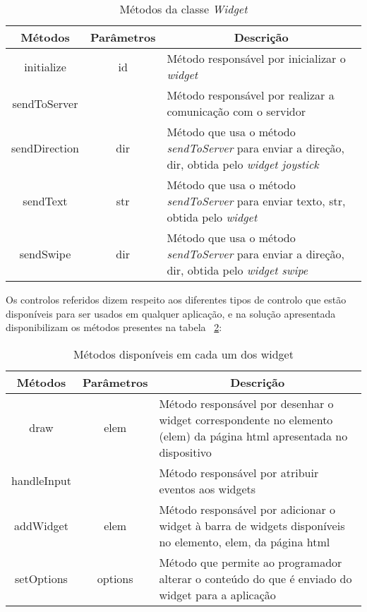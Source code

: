 	\begin{table}[ht]
 	\renewcommand{\arraystretch}{1.5}
	\centering

	\begin{tabular}{ p{2cm}|p{2cm}|p{10cm}  }
	\multicolumn{1}{c}{\textbf{Métodos}} & \multicolumn{1}{c}{\textbf{Parâmetros}} & \multicolumn{1}{c}{\textbf{Descrição}} \\
	\hline
	\multicolumn{1}{c}{initialize} & \multicolumn{1}{c}{id} &Método responsável por inicializar o \textit{widget} \\
	\hline
	\multicolumn{1}{c}{sendToServer} & \multicolumn{1}{c}{} &Método responsável por realizar a comunicação com o servidor \\
	\hline
	\multicolumn{1}{c}{sendDirection} & \multicolumn{1}{c}{dir} &Método que usa o método \textit{sendToServer} para enviar a direção, dir, obtida pelo \textit{widget joystick} \\
	\hline
	\multicolumn{1}{c}{sendText} & \multicolumn{1}{c}{str} &Método que usa o método \textit{sendToServer} para enviar texto, str, obtida pelo \textit{widget}  \\
	\hline
	\multicolumn{1}{c}{sendSwipe} & \multicolumn{1}{c}{dir} &Método que usa o método \textit{sendToServer} para enviar a direção, dir, obtida pelo \textit{widget swipe}  \\
	\hline
	\end{tabular}
	\caption{Métodos da classe \textit{Widget}}
	\label{table:widget_met}
	\end{table}
	
	Os controlos referidos dizem respeito aos diferentes tipos de controlo que estão disponíveis para ser usados em qualquer aplicação, e na solução apresentada disponibilizam os métodos presentes na tabela ~\ref{table:metodos}:
	
 	\begin{table}[ht]
 	\renewcommand{\arraystretch}{1.5}
	\centering

	\begin{tabular}{ p{2cm}|p{2cm}|p{10cm}  }
	\multicolumn{1}{c}{\textbf{Métodos}} & \multicolumn{1}{c}{\textbf{Parâmetros}} & \multicolumn{1}{c}{\textbf{Descrição}} \\
	\hline
	\multicolumn{1}{c}{draw} & \multicolumn{1}{c}{elem} &Método responsável por desenhar o widget correspondente no elemento (elem) da página html apresentada no dispositivo \\
	\hline
	\multicolumn{1}{c}{handleInput} & \multicolumn{1}{c}{} &Método responsável por atribuir eventos aos widgets \\
	\hline
	\multicolumn{1}{c}{addWidget} & \multicolumn{1}{c}{elem} &Método responsável por adicionar o widget à barra de widgets disponíveis no elemento, elem, da página html \\
	\hline
	\multicolumn{1}{c}{setOptions} & \multicolumn{1}{c}{options} &Método que permite ao programador alterar o conteúdo do que é enviado do widget para a aplicação  \\
	\hline
	\end{tabular}
	\caption{Métodos disponíveis em cada um dos widget}
	\label{table:metodos}
	\end{table}


